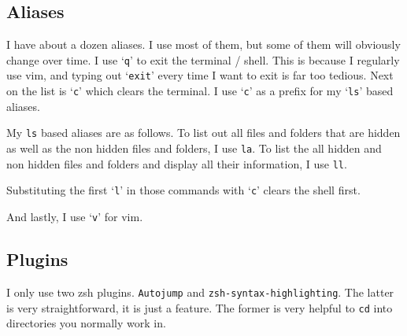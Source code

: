 \documentclass[12pt, a4paper]{article}
\begin{document}
\subsection{Aliases}

I have about a dozen aliases.
I use most of them, but some of them will obviously change over time.
I use `\texttt{q}' to exit the terminal / shell.
This is because I regularly use vim, and typing out `\texttt{exit}' every time I want to exit is far too tedious.
Next on the list is `\texttt{c}' which clears the terminal.
I use `\texttt{c}' as a prefix for my `\texttt{ls}' based aliases.

My \texttt{ls} based aliases are as follows.
To list out all files and folders that are hidden as well as the non hidden files and folders, I use \texttt{la}.
To list the all hidden and non hidden files and folders and display all their information, I use \texttt{ll}.

Substituting the first `\texttt{l}' in those commands with `\texttt{c}' clears the shell first.

And lastly, I use `\texttt{v}' for vim.

\subsection{Plugins}

I only use two zsh plugins.
\texttt{Autojump} and \texttt{zsh-syntax-highlighting}.
The latter is very straightforward, it is just a feature.
The former is very helpful to \texttt{cd} into directories you normally work in.
\end{document}
